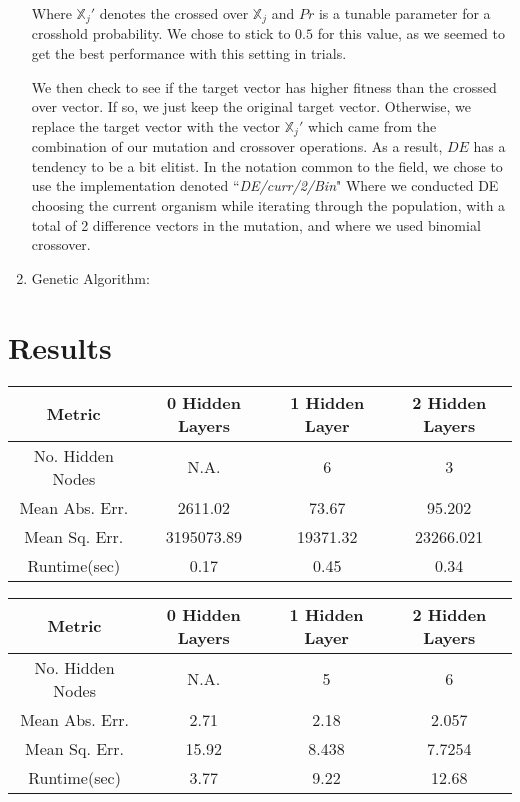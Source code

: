 \documentclass[twoside,11pt]{article}
\begin{document}
\begin{enumerate}
		Where $\mathbb{X}_j'$ denotes the crossed over $\mathbb{X}_j$ and $Pr$ is a tunable parameter for a crosshold probability. We chose to stick to $0.5$ for this
		value, as we seemed to get the best performance with this setting in trials.

		We then check to see if the target vector has higher fitness than the crossed over vector. If so, we just keep the original target vector. Otherwise, we replace
		the target vector with the vector $\mathbb{X}_j'$ which came from the combination of our mutation and crossover operations. As a result, $DE$ has a tendency to
		be a bit elitist. In the notation common to the field, we chose to use the implementation denoted ``\textit{DE/curr/2/Bin}" Where we conducted DE choosing the 
		current organism while iterating through the population, with a total of 2 difference vectors in the mutation, and where we used binomial crossover.

\item Genetic Algorithm:


\end{enumerate}

\section{Results}
\begin{center}
	\begin{tabular}{|c c c c|}
		\hline
		Metric & 0 Hidden Layers & 1 Hidden Layer & 2 Hidden Layers \\ [0.5ex]
		\hline \hline
		No. Hidden Nodes & N.A. & 6 & 3 \\
		\hline
		Mean Abs. Err. & 2611.02 & 73.67 & 95.202 \\
		\hline
		Mean Sq. Err. & 3195073.89 & 19371.32 & 23266.021 \\
		\hline
		Runtime(sec) & 0.17 & 0.45 & 0.34 \\
		\hline
	\end{tabular}
\end{center}

\begin{center}
	\begin{tabular}{|c c c c|}
		\hline
		Metric & 0 Hidden Layers & 1 Hidden Layer & 2 Hidden Layers \\ [0.5ex]
		\hline \hline
		No. Hidden Nodes & N.A. & 5 & 6 \\
		\hline
		Mean Abs. Err. & 2.71 & 2.18 & 2.057 \\
		\hline
		Mean Sq. Err. & 15.92 & 8.438 & 7.7254 \\
		\hline
		Runtime(sec) & 3.77 & 9.22 & 12.68 \\
		\hline
	\end{tabular}
\end{center}
\end{document}
